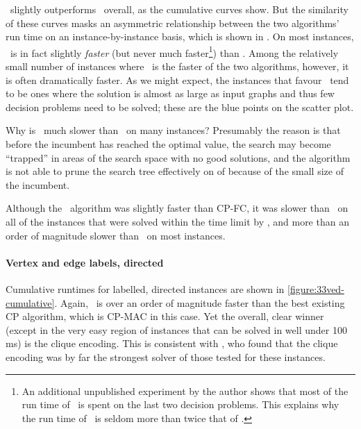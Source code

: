 \McSplitDown\ slightly outperforms \McSplit\ overall, as the cumulative curves
show. But the similarity of these curves masks an asymmetric relationship
between the two algorithms' run time on an instance-by-instance basis, which is
shown in .  On most instances, \McSplit\ is in fact
slightly \emph{faster} (but never much faster\footnote{An additional unpublished
experiment by the author shows
that most of the run time of \McSplitDown\ is spent on the last two decision
problems. This explains why the run time of \McSplitDown\ is seldom more than
twice that of \McSplit.}) than \McSplitDown.  Among the relatively
small number of instances where \McSplitDown\ is the faster of the two
algorithms, however, it is often dramatically faster.  As we might expect, the
instances that favour \McSplitDown\ tend to be ones where the solution is
almost as large as input graphs and thus few decision problems need to be
solved; these are the blue points on the scatter plot.

Why is \McSplit\ much slower than \McSplitDown\ on many instances?  Presumably
the reason is that before the incumbent has reached the optimal value,
the search may become ``trapped'' in areas of the search space with no good solutions,
and the algorithm is not able to prune the search tree effectively
on  of  because of the
small size of the incumbent.

Although the \kDown\ algorithm was slightly faster than CP-FC, it was slower
than \McSplitDown\ on all of the instances that were solved within the time
limit by \kDown, and more than an order of magnitude slower than \McSplitDown\
on most instances.








\paragraph{Vertex and edge labels, directed} Cumulative runtimes for labelled,
directed instances are shown in \cref{figure:33ved-cumulative}. Again, \McSplit\ is over
an order of magnitude faster than the best existing CP algorithm, which is
CP-MAC in this case. Yet the overall, clear winner
(except in the very easy region of instances that can be solved in well under 100 ms)
is the clique encoding.  This is consistent with
\citet{DBLP:conf/cp/McCreeshNPS16}, who found that the clique encoding was by far
the strongest solver of those tested for these instances.

